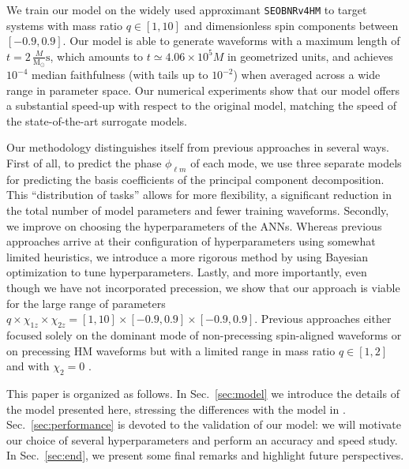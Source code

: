 \documentclass[twocolumn,showpacs,preprintnumbers,nofootinbib,prd,
superscriptaddress,10pt]{revtex4-2}
\begin{document}
We train our model on the widely used approximant \texttt{SEOBNRv4HM} \cite{Cotesta:2018fcv} to target systems with mass ratio $q \in [1,10]$ and dimensionless spin components between $[-0.9, 0.9]$.
Our model is able to generate waveforms with a maximum length of $t = 2 \, \frac{M}{\textrm{M}_\odot} \textrm{s}$, which amounts to $t \simeq 4.06\times 10^5 M$ in geometrized units, and achieves $10^{-4}$ median faithfulness (with tails up to $10^{-2}$) when averaged across a wide range in parameter space.
Our numerical experiments show that our model offers a substantial speed-up with respect to the original model, matching 
the speed of the state-of-the-art surrogate models.

Our methodology distinguishes itself from previous approaches \cite{Chua:2018woh, Khan:2020fso, Thomas:2022rmc} in several ways. First of all, to predict the phase $\phi_{\ell m}$ of each mode, we use three separate models for predicting the basis coefficients of the principal component decomposition. This ``distribution of tasks'' allows for more flexibility, a significant reduction in the total number of model parameters and fewer training waveforms. Secondly, we improve on choosing the hyperparameters of the ANNs. Whereas previous approaches arrive at their configuration of hyperparameters using somewhat limited heuristics, we introduce a more rigorous method by using Bayesian optimization to tune hyperparameters.
Lastly, and more importantly, even though we have not incorporated precession, we show that our approach is viable for the large range of parameters ${q \times \chi_{1z} \times \chi_{2z} = [1,10]\times [-0.9,0.9]\times[-0.9,0.9]}$. Previous approaches either focused solely on the dominant mode of non-precessing spin-aligned waveforms \cite{Khan:2020fso, Chua:2018woh} or on precessing HM waveforms but with a limited range in mass ratio $q \in [1,2]$ and with $\chi_{2}=0$ \cite{Thomas:2022rmc}.

This paper is organized as follows. In Sec.~\ref{sec:model} we introduce the details of the model presented here, 
stressing the differences with the model in \cite{Schmidt:2020yuu}.
Sec.~\ref{sec:performance} is devoted to the validation of our model: we will motivate our choice of several 
hyperparameters and perform an accuracy and speed study.
In Sec.~\ref{sec:end}, we present some final remarks and highlight future perspectives.
\end{document}
